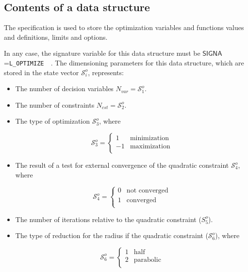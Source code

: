 \subsection{Contents of a  data structure}

The  specification is used to store the optimization variables and functions values and definitions, limits and
options.

\vskip 0.08cm

In any case, the signature variable for this data structure must be $\mathsf{SIGNA}$=\verb*|L_OPTIMIZE  |. The dimensioning
parameters for this data structure, which are stored in the state vector $\mathcal{S}^{o}_{i}$, represents:

\begin{itemize}
\item The number of decision variables $N_{var} = \mathcal{S}^{o}_{1}$.
\item The number of constraints $N_{cst} = \mathcal{S}^{o}_{2}$.
\item The type of optimization  $\mathcal{S}^{o}_{3}$, where

\begin{displaymath}
\mathcal{S}^{o}_{3} = \left\{
\begin{array}{rl}
 1 & \textrm{minimization} \\
 -1 & \textrm{maximization} \\
\end{array} \right.
\end{displaymath}

\item The result of a test for external convergence of the quadratic constraint $\mathcal{S}^{o}_{4}$, where

\begin{displaymath}
\mathcal{S}^{o}_{4} = \left\{
\begin{array}{rl}
 0 & \textrm{not converged} \\
 1 & \textrm{converged} \\
\end{array} \right.
\end{displaymath}

\item The number of iterations relative to the quadratic constraint (${S}^{o}_{5}$).
\item The type of reduction for the radius if the quadratic constraint ($\mathcal{S}^{o}_{6}$), where

\begin{displaymath}
\mathcal{S}^{o}_{6} = \left\{
\begin{array}{rl}
 1 & \textrm{half} \\
 2 & \textrm{parabolic} \\
\end{array} \right.
\end{displaymath}


\end{itemize}

